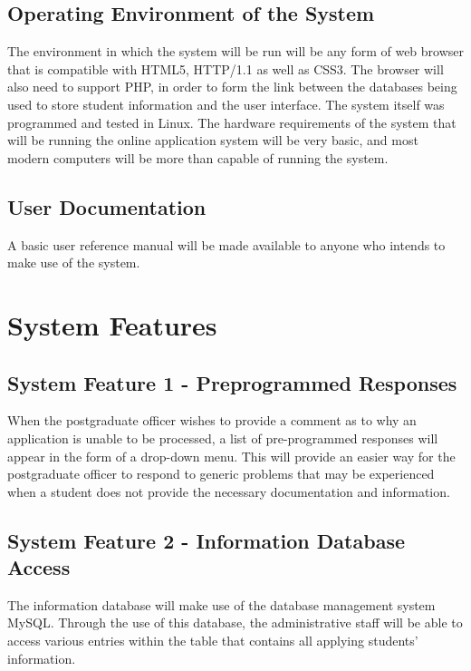 \documentclass[journal,comsoc,onecolumn]{IEEEtran}
\begin{document}
\subsection{Operating Environment of the System}
The environment in which the system will be run will be any form of web browser that is compatible with HTML5, HTTP/1.1 as well as CSS3. The browser will also need to support PHP, in order to form the link between the databases being used to store student information and the user interface.
The system itself was programmed and tested in Linux. The hardware requirements of the system that will be running the online application system will be very basic, and most modern computers will be more than capable of running the system.

\subsection{User Documentation}
A basic user reference manual will be made available to anyone who intends to make use of the system.

\pagebreak


\section{System Features}

\subsection{System Feature 1 - Preprogrammed Responses}
When the postgraduate officer wishes to provide a comment as to why an application is unable to be processed, a list of pre-programmed responses will appear in the form of a drop-down menu. This will provide an easier way for the postgraduate officer to respond to generic problems that may be experienced when a student does not provide the necessary documentation and information.

\subsection{System Feature 2 - Information Database Access}
The information database will make use of the database management system MySQL. Through the use of this database, the administrative staff will be able to access various entries within the table that contains all applying students' information.
\end{document}
